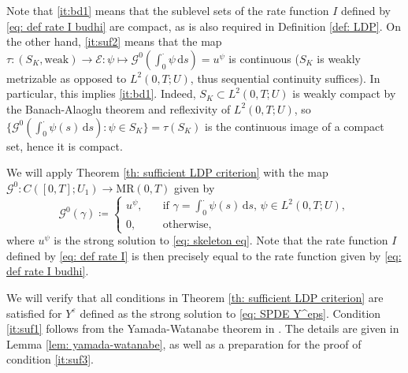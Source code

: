 \documentclass{amsart}
\newcommand{\dd}{\,\mathrm{d}}
\renewcommand{\MR}{\mathrm{MR}}
\newcommand{\<}{\langle}
\newcommand{\?}{\rangle}
\theoremstyle{plain}
\theoremstyle{remark}
\theoremstyle{plain}
\numberwithin{equation}{section}
\newcommand{\G}{\mathcal{G}}
\newcommand{\eps}{\varepsilon}
\begin{document}
Note that \ref{it:bd1} means that the sublevel sets of the rate function $I$ defined by \eqref{eq: def rate I budhi} are compact, as is also required in Definition \ref{def: LDP}. On the other hand, \ref{it:suf2} means that the map $\tau\colon (S_K,\mathrm{weak})\to \mathcal{E}\colon \psi\mapsto \mathcal{G}^0(\int_0^\cdot \psi\dd s)=u^{\psi}$
is continuous ($S_K$ is weakly metrizable as opposed to $L^2(0,T;U)$, thus sequential continuity suffices). In particular, this implies \ref{it:bd1}. Indeed,  $S_K\subset L^2(0,T;U)$ is weakly compact by the Banach-Alaoglu theorem and reflexivity of $L^2(0,T;U)$, so $\{\G^0(\int_0^\cdot \psi(s)\dd s):\psi\in S_K\}=\tau(S_K)$ is the continuous image of a compact set, hence it is compact.

We will apply Theorem \ref{th: sufficient LDP criterion} with the map $\mathcal{G}^0\colon C([0,T];U_1)\to\MR(0,T)$ given by
  \begin{equation}\label{eq: def G^0}
  \mathcal{G}^0(\gamma)\coloneqq \begin{cases}
                    u^\psi, \quad &\text{if } \gamma=\int_0^\cdot \psi(s)\dd s, \, \psi\in L^2(0,T;U),\\
                    0, &\text{otherwise},
                    \end{cases}
  \end{equation}
where $u^\psi$ is the strong solution to \eqref{eq: skeleton eq}. Note that the rate function $I$ defined by \eqref{eq: def rate I} is then precisely equal to the rate function given by \eqref{eq: def rate I budhi}.



We will verify that all conditions in Theorem \ref{th: sufficient LDP criterion} are satisfied for $Y^\eps$ defined as the strong solution to \eqref{eq: SPDE Y^eps}. Condition \ref{it:suf1} follows from the Yamada-Watanabe theorem in \cite{rock08}. The details are given in Lemma \ref{lem: yamada-watanabe}, as well as a preparation for the proof of condition \ref{it:suf3}.
\end{document}
